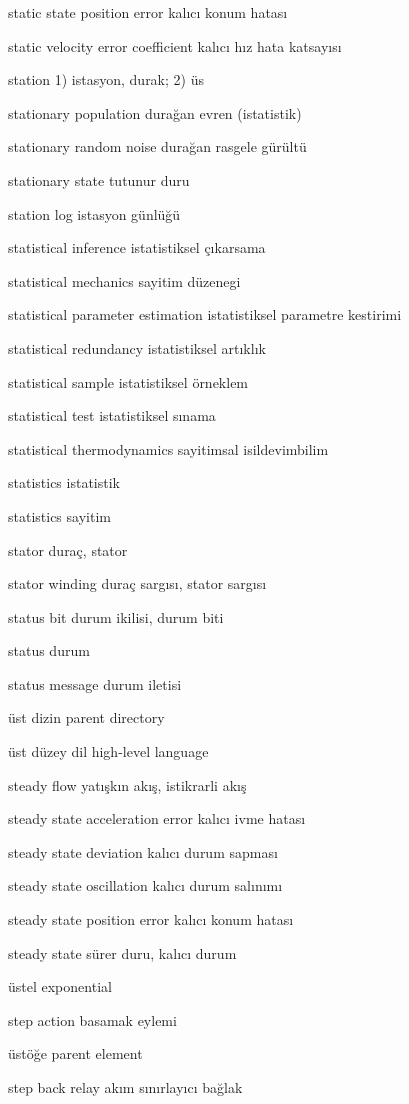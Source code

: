 \documentclass[12pt,fleqn]{article}\usepackage{../../common}
\begin{document}
static state position error kalıcı konum hatası

static velocity error coefficient kalıcı hız hata katsayısı

station 1) istasyon, durak; 2) üs

stationary population durağan evren (istatistik)

stationary random noise durağan rasgele gürültü

stationary state tutunur duru

station log istasyon günlüğü

statistical inference istatistiksel çıkarsama

statistical mechanics sayitim düzenegi

statistical parameter estimation istatistiksel parametre kestirimi

statistical redundancy istatistiksel artıklık

statistical sample istatistiksel örneklem

statistical test istatistiksel sınama

statistical thermodynamics sayitimsal isildevimbilim

statistics istatistik

statistics sayitim

stator duraç, stator

stator winding duraç sargısı, stator sargısı

status bit durum ikilisi, durum biti

status durum

status message durum iletisi

üst dizin parent directory

üst düzey dil high-level language

steady flow yatışkın akış, istikrarli akış

steady state acceleration error kalıcı ivme hatası

steady state deviation kalıcı durum sapması

steady state oscillation kalıcı durum salınımı

steady state position error kalıcı konum hatası

steady state sürer duru, kalıcı durum

üstel exponential

step action basamak eylemi

üstöğe parent element

step back relay akım sınırlayıcı bağlak
\end{document}
